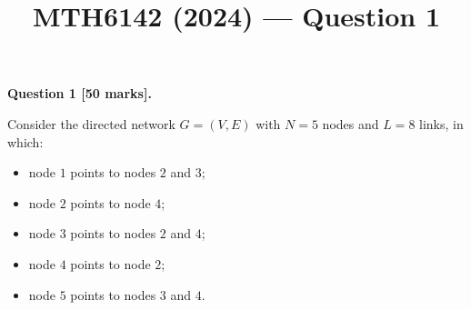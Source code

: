 \documentclass[11pt,a4paper]{article}
\title{MTH6142 (2024) --- Question 1}
\author{}
\date{}
\begin{document}
\maketitle

\noindent\textbf{Question 1 [50 marks].}

Consider the directed network $G = (V, E)$ with $N = 5$ nodes and $L = 8$ links, in which:
\begin{itemize}[nosep]
  \item node $1$ points to nodes $2$ and $3$;
  \item node $2$ points to node $4$;
  \item node $3$ points to nodes $2$ and $4$;
  \item node $4$ points to node $2$;
  \item node $5$ points to nodes $3$ and $4$.
\end{itemize}
\end{document}
